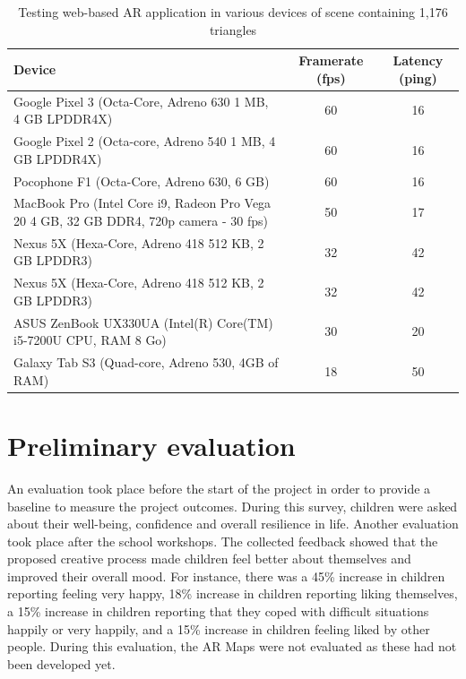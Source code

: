 \documentclass[acmlarge,screen,dvipsnames]{acmart}
\begin{document}
\begin{table}[h] \centering 
\begin{tabular}{|>{\arraybackslash}p{8cm}|c|c|} 
\hline 
Device & Framerate (fps) & Latency (ping)\\  
\hline \hline 
Google Pixel 3 (Octa-Core, Adreno 630 1 MB, 4 GB LPDDR4X) &  60 & 16\\ 
\hline
 Google Pixel 2 (Octa-core,
Adreno 540 1 MB, 4 GB LPDDR4X)  &  60 & 16\\ 
\hline
Pocophone F1 (Octa-Core, Adreno 630, 6 GB) & 60 & 16 \\ 
\hline 
MacBook Pro
(Intel Core i9, Radeon Pro Vega 20 4 GB, 32 GB DDR4, 720p camera - 30 fps)  &
50 & 17\\ 
\hline 
Nexus 5X (Hexa-Core, Adreno 418 512 KB, 2 GB LPDDR3) & 32 &
42 \\ 
\hline  
Nexus 5X (Hexa-Core, Adreno 418 512 KB, 2 GB LPDDR3) & 32 & 42
\\ 
\hline 
ASUS ZenBook UX330UA (Intel(R) Core(TM) i5-7200U CPU, RAM 8 Go) & 30
& 20\\ 
\hline 
Galaxy Tab S3 (Quad-core, Adreno 530, 4GB of RAM) & 18 & 50\\
\hline 
\end{tabular} 
 \caption{Testing web-based AR application in various
devices of scene containing 1,176 triangles} \label{table:framerates} 
\end{table}




\section{Preliminary evaluation} \label{eval} An evaluation took place before
the start of the project in order to provide a baseline to measure the
project outcomes. During this survey, children were asked about their
well-being, confidence and overall resilience in life. Another evaluation took
place after the school workshops. The collected feedback showed that the proposed creative process made children feel better about themselves and improved their overall mood. For
instance, there was a 45\% increase in children reporting feeling very happy,
18\% increase in children reporting liking themselves, a 15\% increase in
children reporting that they coped with difficult situations happily or very
happily, and a 15\% increase in children feeling liked by other people. During
this evaluation, the AR Maps were not evaluated as these had not been developed yet.
\end{document}
